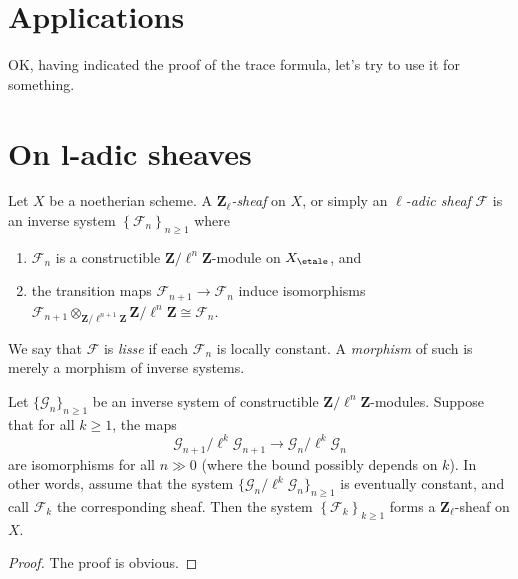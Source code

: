 \section{Applications}
\label{section-applications}

\noindent
OK, having indicated the proof of the trace formula, let's try to use it
for something.





\section{On l-adic sheaves}
\label{section-l-adic-sheaves}

\begin{definition}
\label{definition-l-adic-sheaf}
Let $X$ be a noetherian scheme. A {\it $\mathbf{Z}_\ell$-sheaf} on $X$, or
simply an {\it $\ell$-adic sheaf} $\mathcal{F}$ is an
inverse system $\left\{\mathcal{F}_n\right\}_{n\geq 1}$ where
\begin{enumerate}
\item
$\mathcal{F}_n$ is a constructible $\mathbf{Z}/\ell^n\mathbf{Z}$-module on
$X_\etale$, and
\item
the transition maps $\mathcal{F}_{n+1}\to \mathcal{F}_n$ induce isomorphisms
$\mathcal{F}_{n+1} \otimes_{\mathbf{Z}/\ell^{n+1}\mathbf{Z}}
\mathbf{Z}/\ell^n\mathbf{Z} \cong \mathcal{F}_n$.
\end{enumerate}
We say that $\mathcal{F}$ is {\it lisse} if each $\mathcal{F}_n$ is locally
constant. A {\it morphism} of such is merely a morphism of inverse systems.
\end{definition}

\begin{lemma}
\label{lemma-eventually-constant}
Let $\{\mathcal{G}_n\}_{n\geq 1}$ be an inverse system of constructible
$\mathbf{Z}/\ell^n\mathbf{Z}$-modules.
Suppose that for all $k\geq 1$, the maps
$$
\mathcal{G}_{n+1}/\ell^k \mathcal{G}_{n+1}\to \mathcal{G}_n /\ell^k
\mathcal{G}_n
$$
are isomorphisms for all $n\gg 0$ (where the bound possibly depends on $k$).
In other words, assume that the system
$\{\mathcal{G}_n/\ell^k\mathcal{G}_n\}_{n\geq 1}$
is eventually constant, and call $\mathcal{F}_k$ the corresponding sheaf.
Then the system $\left\{\mathcal{F}_k\right\}_{k\geq 1}$ forms a
$\mathbf{Z}_\ell$-sheaf on $X$.
\end{lemma}

\begin{proof}
The proof is obvious.
\end{proof}

